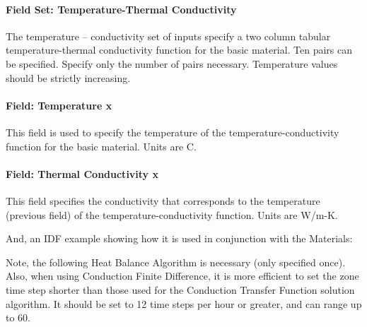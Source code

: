 \paragraph{Field Set: Temperature-Thermal Conductivity}\label{field-set-temperature-thermal-conductivity}

The temperature -- conductivity set of inputs specify a two column tabular temperature-thermal conductivity function for the basic material. Ten pairs can be specified. Specify only the number of pairs necessary. Temperature values should be strictly increasing.

\paragraph{Field: Temperature x}\label{field-temperature-x-1}

This field is used to specify the temperature of the temperature-conductivity function for the basic material. Units are C.

\paragraph{Field: Thermal Conductivity x}\label{field-thermal-conductivity-x}

This field specifies the conductivity that corresponds to the temperature (previous field) of the temperature-conductivity function. Units are W/m-K.

And, an IDF example showing how it is used in conjunction with the Materials:

Note, the following Heat Balance Algorithm is necessary (only specified once). Also, when using Conduction Finite Difference, it is more efficient to set the zone time step shorter than those used for the Conduction Transfer Function solution algorithm. It should be set to 12 time steps per hour or greater, and can range up to 60.

